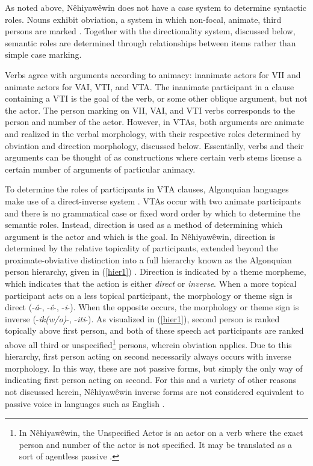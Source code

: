 As noted above, Nêhiyawêwin does not have a case system to determine syntactic roles. Nouns exhibit obviation, a system in which non-focal, animate, third persons are marked \citep[94]{Bloomfield1946}. Together with the directionality system, discussed below, semantic roles are determined through relationships between items rather than simple case marking.


Verbs agree with arguments according to animacy: inanimate actors for VII and animate actors for VAI, VTI, and VTA. The inanimate participant in a clause containing a VTI is the goal of the verb, or some other oblique argument, but not the actor. The person marking on VII, VAI, and VTI verbs corresponds to the person and number of the actor. However, in VTAs, both arguments are animate and realized in the verbal morphology, with their respective roles determined by obviation and direction morphology, discussed below. Essentially, verbs and their arguments can be thought of as constructions where certain verb stems license a certain number of arguments of particular animacy.



To determine the roles of participants in VTA clauses, Algonquian languages make use of a direct-inverse system \citep{Wolfart1973,jacques2014direct}. VTAs occur with two animate participants and there is no grammatical case or fixed word order by which to determine the semantic roles. Instead, direction is used as a method of determining which argument is the actor and which is the goal. In Nêhiyawêwin, direction is determined by the relative topicality of participants, extended beyond the proximate-obviative distinction into a full hierarchy known as the Algonquian person hierarchy, given in (\ref{hier1}) \citep{jolley1983algonquian}. Direction is indicated by a theme morpheme, which indicates that the action is either \textit{direct} or \textit{inverse}. When a more topical participant acts on a less topical participant, the morphology or theme sign is direct (-\textit{\^{a}}-, -\textit{\^{e}}-, -\textit{i}-). When the opposite occurs, the morphology or theme sign is inverse (-\textit{ik(w/o)}-, -\textit{iti}-). As visualized in (\ref{hier1}), second person is ranked topically above first person, and both of these speech act participants are ranked above all third or unspecified\footnote{In Nêhiyawêwin, the Unspecified Actor is an actor on a verb where the exact person and number of the actor is not specified. It may be translated as a sort of agentless passive \citep{Wolvengrey2011}.} persons, wherein obviation applies. Due to this hierarchy, first person acting on second necessarily always occurs with inverse morphology. In this way, these are not passive forms, but simply the only way of indicating first person acting on second. For this and a variety of other reasons not discussed herein, Nêhiyawêwin inverse forms are not considered equivalent to passive voice in languages such as English \citep{Wolfart1973,Wolvengrey2011}.



